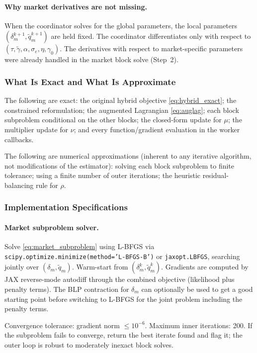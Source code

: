 \documentclass[11pt]{article}
\begin{document}
\paragraph{Why market derivatives are not missing.} When the coordinator solves for the global parameters, the local parameters $(\delta_m^{k+1},\tilde q_m^{k+1})$ are held fixed. The coordinator differentiates only with respect to $(\tau,\tilde\gamma,\alpha,\sigma_e,\eta,\gamma_0)$. The derivatives with respect to market-specific parameters were already handled in the market block solve (Step~2).

\subsubsection{What Is Exact and What Is Approximate}

The following are exact: the original hybrid objective \eqref{eq:hybrid_exact}; the constrained reformulation; the augmented Lagrangian \eqref{eq:auglag}; each block subproblem conditional on the other blocks; the closed-form update for $\mu$; the multiplier update for $\nu$; and every function/gradient evaluation in the worker callbacks.

The following are numerical approximations (inherent to any iterative algorithm, not modifications of the estimator): solving each block subproblem to finite tolerance; using a finite number of outer iterations; the heuristic residual-balancing rule for $\rho$.

\subsubsection{Implementation Specifications}\label{sec:implementation}

\paragraph{Market subproblem solver.}\label{sec:market_solver} Solve \eqref{eq:market_subproblem} using L-BFGS via \texttt{scipy.optimize.minimize(method='L-BFGS-B')} or \texttt{jaxopt.LBFGS}, searching jointly over $(\delta_m,\tilde q_m)$. Warm-start from $(\delta_m^k,\tilde q_m^k)$. Gradients are computed by JAX reverse-mode autodiff through the combined objective (likelihood plus penalty terms). The BLP contraction for $\delta_m$ can optionally be used to get a good starting point before switching to L-BFGS for the joint problem including the penalty terms.

Convergence tolerance: gradient norm $\leq 10^{-6}$. Maximum inner iterations: 200. If the subproblem fails to converge, return the best iterate found and flag it; the outer loop is robust to moderately inexact block solves.
\end{document}
